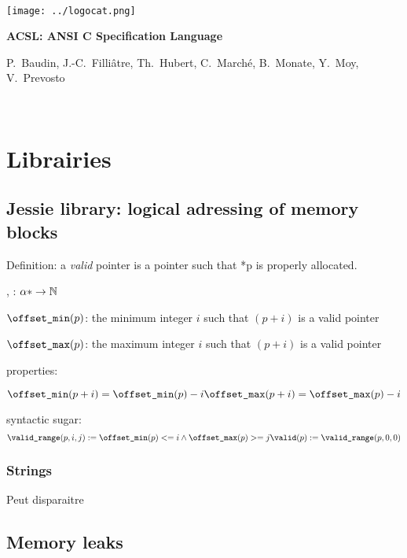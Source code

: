 \documentclass[a4paper]{report}
\begin{document}
\begin{center}

~\vfill

\texttt{[image: ../logocat.png]}

\bigskip

{\Huge\bfseries ACSL: ANSI C Specification Language}

\bigskip

{P.~Baudin, J.-C.~Filli\^atre, Th.~Hubert,
  C.~March\'e, B.~Monate, Y.~Moy, V.~Prevosto}

\vfill ~
\end{center}

\clearpage






\chapter{Librairies}
\label{chap:lib}

\section{Jessie library: logical adressing of memory blocks}

Definition: a \emph{valid} pointer is a pointer such that *p is properly
allocated.

\offsetmin, \offsetmax : $\alpha * \rightarrow \mathbb{N}$

$\texttt{{\textbackslash}offset\_min}(p)$: the minimum integer $i$ such that $(p+i)$ is a valid
pointer

$\texttt{{\textbackslash}offset\_max}(p)$: the maximum integer $i$ such that $(p+i)$ is a valid
pointer

properties:

\[
\texttt{{\textbackslash}offset\_min}(p+i) = \texttt{{\textbackslash}offset\_min}(p)-i
\texttt{{\textbackslash}offset\_max}(p+i) = \texttt{{\textbackslash}offset\_max}(p)-i
\]

syntactic sugar:
\[
\texttt{{\textbackslash}valid\_range}(p,i,j) := \texttt{{\textbackslash}offset\_min}(p) <= i \land \texttt{{\textbackslash}offset\_max}(p) >= j
\texttt{{\textbackslash}valid}(p) := \texttt{{\textbackslash}valid\_range}(p,0,0)
\]


\subsection{Strings}

\strlen

Peut disparaitre

\section{Memory leaks}
\end{document}
